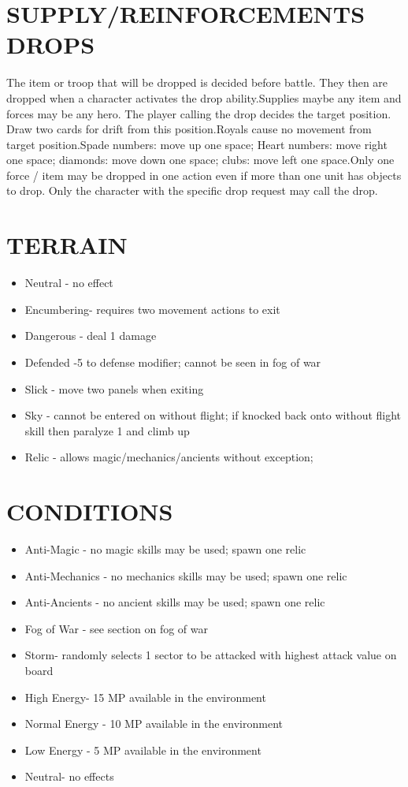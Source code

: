 \section{SUPPLY/REINFORCEMENTS DROPS}
The item or troop that will be dropped is decided before battle.  They then are dropped when a character activates the drop ability.Supplies maybe any item and forces may be any hero.  The player calling the drop decides the target position.  Draw two cards for drift from this position.Royals cause no movement from target position.Spade numbers: move up one space; Heart numbers: move right one space; diamonds: move down one space; clubs: move left one space.Only one force
/ item may be dropped in one action even if more than one unit has objects to drop.  Only the character with the specific drop request may call the drop.

\section{TERRAIN}
\begin{itemize}
\item Neutral - no effect
\item Encumbering- requires two movement actions to exit
\item Dangerous - deal 1 damage
\item Defended -5 to defense modifier; cannot be seen in fog of war
\item Slick - move two panels when exiting
\item Sky - cannot be entered on without flight; if knocked back onto without flight skill then paralyze 1 and climb up
\item Relic - allows magic/mechanics/ancients without exception; 
\end{itemize}

\section {CONDITIONS}
\begin{itemize}
\item Anti-Magic - no magic skills may be used; spawn one relic
\item Anti-Mechanics - no mechanics skills may be used; spawn one relic
\item Anti-Ancients - no ancient skills may be used; spawn one relic
\item Fog of War - see section on fog of war
\item Storm- randomly selects 1 sector to be attacked with highest attack value on board
\item High Energy- 15 MP available in the environment
\item Normal Energy - 10 MP available in the environment
\item Low Energy - 5 MP available in the environment
\item Neutral- no effects
\end{itemize}

